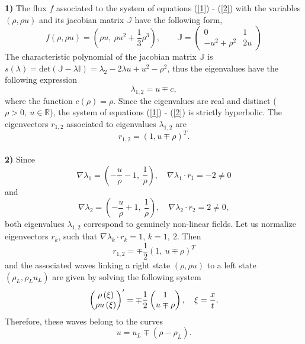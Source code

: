 \documentclass[a4paper, 10pt]{article}
\newcommand*\colvec[3][]{
	\begin{pmatrix}\ifx\relax#1\relax\else#1\\\fi#2\\#3\end{pmatrix}
}
\begin{document}
\textbf{1)} The flux $ f $ associated to the system of equations (\ref{1}) - (\ref{2}) with the variables $ (\rho, \rho u) $ and its jacobian matrix $ \mathbb{J} $ have the following form,\\
\begin{equation}
f \left( \rho, \rho u \right) = \left( \rho u, \: \rho u^{2} + \frac{1}{3} \rho^{3} \right), \qquad \mathbb{J} = \begin{pmatrix}
0 & 1 \\
-u^{2} + \rho^{2} & 2u
\end{pmatrix}
\end{equation}
The characteristic polynomial of the jacobian matrix $ \mathbb{J} $ is $ s\left( \lambda \right) = \mathrm{det} (\mathbb{J} - \lambda \mathbb{I}) = \lambda_{2} - 2 \lambda u + u^{2} - \rho^{2} $, thus the eigenvalues have the following expression
\begin{equation}
\lambda_{1, 2} = u \mp c,
\end{equation}
where the function $ c\left( \rho \right) = \rho $. Since the eigenvalues are real and distinct ($ \rho > 0, \: u \in \mathbb{R} $), the system of equations (\ref{1}) - (\ref{2}) is strictly hyperbolic. The eigenvectors $ r_{1, 2} $ associated to eigenvalues $ \lambda_{1, 2} $ are
\begin{equation}
r_{1, 2} = \left(1, u \mp \rho \right)^{T}.
\end{equation}\\

\textbf{2)} Since
\begin{equation}
\nabla \lambda_1 = \left( - \frac{u}{\rho} - 1, \: \frac{1}{\rho}\right), \quad \nabla \lambda_1 \cdot r_1 = -2 \neq 0
\end{equation}
and
\begin{equation}
\nabla \lambda_2 = \left( - \frac{u}{\rho} + 1, \: \frac{1}{\rho}\right), \quad \nabla \lambda_2 \cdot r_2 = 2 \neq 0,
\end{equation}
both eigenvalues $ \lambda_{1, 2} $ correspond to genuinely non-linear fields. Let us normalize eigenvectors $ r_{k} $, such that $ \nabla \lambda_k \cdot r_{k} = 1 $, $ k = 1, \:2 $. Then
\begin{equation}
r_{1,2} = \mp \frac{1}{2} \left( 1, \: u \mp \rho \right)^{T}
\end{equation}
and the associated waves linking a right state $ (\rho, \rho u) $ to a left state $ (\rho_L, \rho_L u_L) $ are given by solving the following system
\begin{equation}
\colvec{\rho\left( \xi \right) }{\rho u \left( \xi \right) }^\prime =  \mp \frac{1}{2} \colvec{1}{ u \mp \rho}, \quad \xi = \frac{x}{t}.
\end{equation}
Therefore, these waves belong to the curves
\begin{equation}
u = u_L \mp \left( \rho - \rho_L \right).
\end{equation}\\
\end{document}
